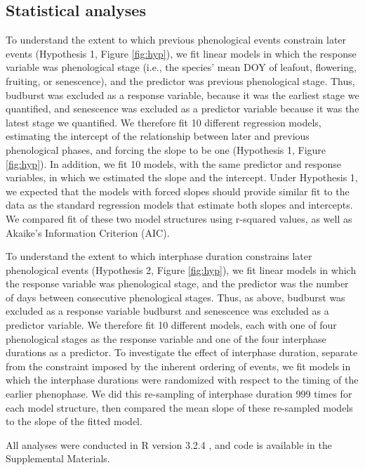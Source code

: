 \documentclass{article}
\begin{document}
\subsection*{Statistical analyses}
To understand the extent to which previous phenological events constrain later events (Hypothesis 1, Figure \ref{fig:hyp}), we fit linear models in which the response variable was phenological stage (i.e., the species' mean DOY of leafout, flowering, fruiting, or senescence), and the predictor was previous phenological stage. Thus, budburst was excluded as a response variable, because it was the earliest stage we quantified, and senescence was excluded as a predictor variable because it was the latest stage we quantified.  We therefore fit 10 different regression models, estimating the intercept of the relationship between later and previous phenological phases, and forcing the slope to be one (Hypothesis 1, Figure \ref{fig:hyp}). In addition, we fit 10 models, with the same predictor and response variables, in which we estimated the slope and the intercept. Under Hypothesis 1, we expected that the models with forced slopes should provide similar fit to the data as the standard regression models that estimate both slopes and intercepts. We compared fit of these two model structures using r-squared values, as well as Akaike's Information Criterion (AIC).  
\par To understand the extent to which interphase duration constrains later phenological events (Hypothesis 2, Figure \ref{fig:hyp}), we fit linear models in which the response variable was phenological stage, and the predictor was the number of days between consecutive phenological stages. Thus, as above, budburst was excluded as a response variable budburst and senescence was excluded as a predictor variable. We therefore fit 10 different models, each with one of four phenological stages as the response variable and one of the four interphase durations as a predictor. To investigate the effect of interphase duration, separate from the constraint imposed by the inherent ordering of events, we fit models in which the interphase durations were randomized with respect to the timing of the earlier phenophase. We did this re-sampling of interphase duration 999 times for each model structure, then compared the mean slope of these re-sampled models to the slope of the fitted model.  
\par All analyses were conducted in R version 3.2.4 \citep{rcoreteam2016}, and code is available in the Supplemental Materials.
\end{document}
